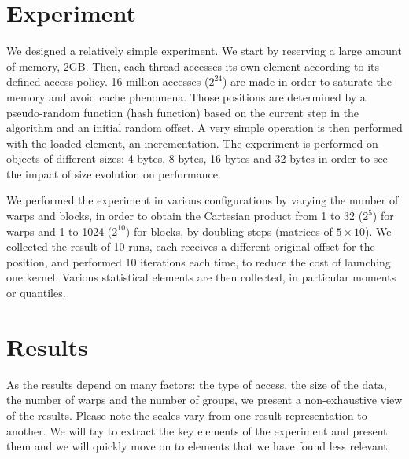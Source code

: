 \section{Experiment}

We designed a relatively simple experiment. We start by reserving a large amount of memory, 2GB. Then, each thread accesses its own element according to its defined access policy. 16 million accesses ($2^{24}$) are made in order to saturate the memory and avoid cache phenomena. Those positions are determined by a pseudo-random function (hash function) based on the current step in the algorithm and an initial random offset. A very simple operation is then performed with the loaded element, an incrementation. The experiment is performed on objects of different sizes: 4 bytes, 8 bytes, 16 bytes and 32 bytes in order to see the impact of size evolution on performance.

We performed the experiment in various configurations by varying the number of warps and blocks, in order to obtain the Cartesian product from 1 to 32 ($2^{5}$) for warps and 1 to 1024 ($2^{10}$) for blocks, by doubling steps (matrices of $5 \times 10$). We collected the result of 10 runs, each receives a different original offset for the position, and performed 10 iterations each time, to reduce the cost of launching one kernel. Various statistical elements are then collected, in particular moments or quantiles.

\section{Results}

As the results depend on many factors: the type of access, the size of the data, the number of warps and the number of groups, we present a non-exhaustive view of the results. Please note the scales vary from one result representation to another. We will try to extract the key elements of the experiment and present them and we will quickly move on to elements that we have found less relevant.

